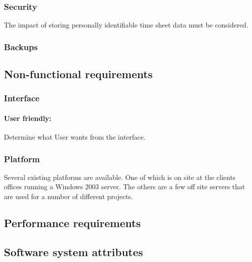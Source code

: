 \documentclass[12pt]{article}
\begin{document}
\subsubsection{Security}\label{sec:Security}
The impact of storing personally identifiable time sheet data must be considered.

\subsubsection{Backups}\label{sec:Backups}

\subsection{Non-functional requirements}
\subsubsection{Interface}\label{sec:Interface}
\paragraph{User friendly:} Determine what User wants from the interface.

\subsubsection{Platform}\label{sec:Platform}
Several existing platforms are available. One of which is on site at the clients offices running a Windows 2003 server. The others are a few off site servers that are used for a number of different projects.

\subsection{Performance requirements}

\subsection{Software system attributes}
\end{document}
